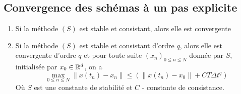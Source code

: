 \subsection{Convergence des schémas à un pas explicite}
\begin{theorem}
    \begin{enumerate}
        \item Si la méthode $(S)$ est stable et consistant, alors elle est convergente
        \item Si la méthode  $(S)$ est stable et consistant d'ordre  $q$, alors elle est convergente d'ordre  $q$ et pour toute suite $(x_n)_{0 \leq n \leq N}$ donnée par $S$, initialisée par $x_0 \in \mathbb{R}^d$, on a 
            \[
            \max_{0 \le n \le N} \|x(t_n) - x_n\| \le \left( \|x(t_n) - x_0\| + CT\Delta t^q \right) 
            \] 
            Où $S$ est une constante de stabilité et  $C$ - constante de consistance.
    \end{enumerate}
\end{theorem}
